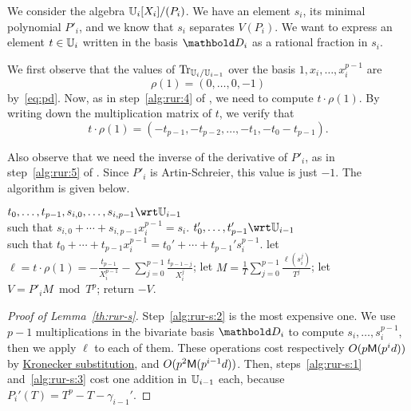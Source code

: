 We consider the algebra $\mathbb{U}_i[X_i]/(P_i)$. We have an element $s_i$,
its minimal polynomial $P'_i$, and we know that $s_i$ separates
$V(P_i)$. We want to express an element $t\in\mathbb{U}_i$ written in the
basis $\basis{D}_i$ as a rational fraction in $s_i$.

We first observe that the values of $\operatorname{Tr}_{\mathbb{U}_i/\mathbb{U}_{i-1}}$ over the
basis $1,x_i,\ldots,x_i^{p-1}$ are 
\begin{equation}
  \label{eq:110}
  \rho(1) = (0,\ldots,0,-1)
\end{equation}
by~\eqref{eq:pd}. Now, as in step~\ref{alg:rur:4} of
, we need to compute $t\cdot\rho(1)$. By
writing down the multiplication matrix of $t$, we verify that
\begin{equation}
  \label{eq:111}
  t\cdot\rho(1) = (-t_{p-1}, -t_{p-2}, \ldots, -t_1, -t_0-t_{p-1})
  \text{.}
\end{equation}

Also observe that we need the inverse of the derivative of $P'_i$, as
in step~\ref{alg:rur:5} of . Since $P'_i$ is
Artin-Schreier, this value is just $-1$. The algorithm
 is given below.

\begin{algorithm}
  \caption{$_{\lst{s}_i}$}
  \label{alg:RUR-si}
  \begin{algorithmic}[1]
    \REQUIRE $t_0,\ldots,t_{p-1},s_{i,0},\ldots,s_{i,p-1}\wrt\U_{i-1}$ \ifafive\\ \fi such that $s_{i,0}+\cdots+s_{i,p-1}x_i^{p-1}=s_i$.
    \ENSURE $t_0',\ldots,t_{p-1}'\wrt\U_{i-1}$ \ifafive\\ \fi such that $t_0+\cdots+t_{p-1}x_i^{p-1}=t_0'+\cdots+t_{p-1}'s_i^{p-1}$.
    \STATE \label{alg:rur-s:1}let $\ell = t\cdot\rho(1) =  -\frac{t_{p-1}}{X_i^{p-1}} - \sum_{j=0}^{p-1} \frac{t_{p-1-j}}{X_i^j}$;
    \STATE \label{alg:rur-s:2}let $M = \frac{1}{T}\sum_{j=0}^{p-1}\frac{\ell(s_i^j)}{T^j}$;
    \STATE \label{alg:rur-s:3}let $V = P'_iM \bmod T^p$;
    \STATE return $-V$.
  \end{algorithmic}
\end{algorithm}

\begin{proof}[Proof of Lemma~\ref{th:rur-s}]
  Step~\ref{alg:rur-s:2} is the most expensive one. We use $p-1$
  multiplications in the bivariate basis $\basis{D}_i$ to compute
  $s_i,\ldots,s_i^{p-1}$, then we apply $\ell$ to each of them. These
  operations cost respectively $O(p\mathsf{M}(p^id))$ by
  \hyperref[sec:mult-polyn]{Kronecker substitution}, and
  $O(p^2\mathsf{M}(p^{i-1}d))$.  Then, steps~\ref{alg:rur-s:1}
  and~\ref{alg:rur-s:3} cost one addition in $\mathbb{U}_{i-1}$ each, because
  $P_i'(T)=T^p-T-\gamma_{i-1}'$.
\end{proof}

